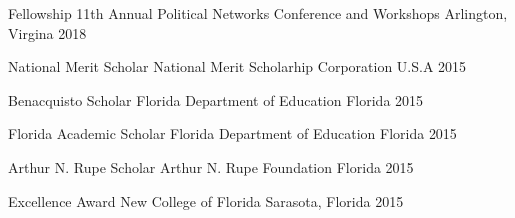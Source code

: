 

\begin{cvhonors}

  \cvhonor
    {Fellowship} %
    {11th Annual Political Networks Conference and Workshops} %
    {Arlington, Virgina} %
    {2018} %

  \cvhonor
    {National Merit Scholar} %
    {National Merit Scholarhip Corporation} %
    {U.S.A} %
    {2015} %

  \cvhonor
    {Benacquisto Scholar} %
    {Florida Department of Education} %
    {Florida} %
    {2015} %

  \cvhonor
    {Florida Academic Scholar} %
    {Florida Department of Education} %
    {Florida} %
    {2015} %

  \cvhonor
    {Arthur N. Rupe Scholar} %
    {Arthur N. Rupe Foundation} %
    {Florida} %
    {2015} %

  \cvhonor
    {Excellence Award} %
    {New College of Florida} %
    {Sarasota, Florida} %
    {2015} %


\end{cvhonors}
